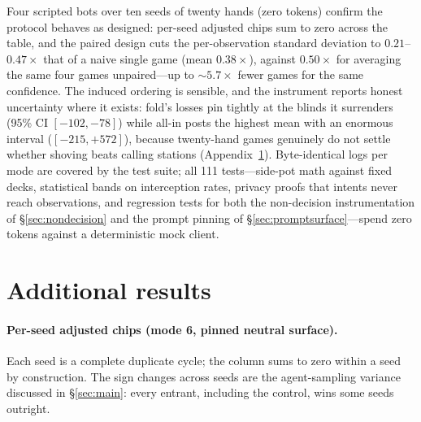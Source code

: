 \documentclass{article}
\begin{document}
Four scripted bots over ten seeds of twenty hands (zero tokens) confirm the
protocol behaves as designed: per-seed adjusted chips sum to zero across
the table, and the paired design cuts the per-observation standard
deviation to $0.21$--$0.47\times$ that of a naive single game (mean
$0.38\times$), against $0.50\times$ for averaging the same four games
unpaired---up to ${\sim}5.7\times$ fewer games for the same confidence. The
induced ordering is sensible, and the instrument reports honest uncertainty
where it exists: fold's losses pin tightly at the blinds it surrenders
(95\% CI $[-102, -78]$) while all-in posts the highest mean with an
enormous interval ($[-215, +572]$), because twenty-hand games genuinely do
not settle whether shoving beats calling stations
(Appendix~\ref{app:results}). Byte-identical logs per mode are covered by
the test suite; all 111 tests---side-pot math against fixed decks,
statistical bands on interception rates, privacy proofs that intents never
reach observations, and regression tests for both the non-decision
instrumentation of \S\ref{sec:nondecision} and the prompt pinning of
\S\ref{sec:promptsurface}---spend zero tokens against a deterministic mock
client.


\section{Additional results}
\label{app:results}

\paragraph{Per-seed adjusted chips (mode 6, pinned neutral surface).} Each
seed is a complete duplicate cycle; the column sums to zero within a seed
by construction. The sign changes across seeds are the agent-sampling
variance discussed in \S\ref{sec:main}: every entrant, including the
control, wins some seeds outright.
\end{document}

